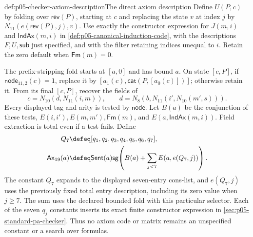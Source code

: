 \begin{hbdefinition}{def:p05-checker-axiom-description}{The direct axiom description}
Define \(U(P,c)\) by folding over \(\mathsf{rev}(P)\), starting at
\(c\) and replacing the state \(v\) at index \(j\) by
\(N_{11}(e(\mathsf{rev}(P),j),v)\).  Use exactly the constructor expression
for \(J(m,i)\) and \(\mathsf{IndAx}(m,i)\) in
\cref{def:p05-canonical-induction-code}, with the descriptions \(F,U,\mathsf{sub}\)
just specified, and with the filter retaining indices unequal to \(i\).
Retain the zero default when \(\mathsf{Fm}(m)=0\).

The prefix-stripping fold starts at \([a,0]\) and has bound \(a\).
On state \([c,P]\), if \(\mathsf{node}_{11,2}(c)=1\), replace it by
\([a_1(c),\mathsf{cat}(P,[a_0(c)])]\); otherwise retain it.
From its final \([c,P]\), recover the fields of
\[
 c=N_{10}(d,N_{11}(i,m)),\qquad
 d=N_8(b,N_{11}(i',N_{10}(m',s))).
\]
Every displayed tag and arity is tested by \(\mathsf{node}\).
Let \(B(a)\) be the conjunction of these tests,
\(E(i,i'),E(m,m'),\mathsf{Fm}(m)\), and
\(E(a,\mathsf{IndAx}(m,i))\).  Field extraction is total even if a test
fails.  Define
\[
\begin{aligned}
 Q_7&\defeq[q_1,q_2,q_3,q_4,q_5,q_6,q_7],\\
 \mathsf{Ax}_{19}(a)&\defeq\mathsf{Sent}(a)
       \mathsf{sg}\!\left(B(a)+\sum_{j<7}E(a,e(Q_7,j))\right).
\end{aligned}
\]
The constant \(Q_7\) expands to the displayed seven-entry cons-list, and
\(e(Q_7,j)\) uses the previously fixed total entry description, including
its zero value when \(j\geq7\).  The sum uses the declared bounded fold
with this particular selector.  Each of the seven \(q_j\) constants inserts
its exact finite constructor expression in
\cref{sec:p05-standard-pa-checker}.  Thus no axiom code or matrix remains an
unspecified constant or a search over formulas.
\end{hbdefinition}

